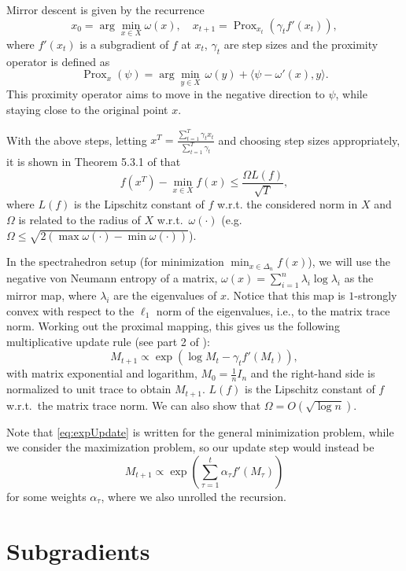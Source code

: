 \documentclass{article}
\DeclareMathOperator{\Prox}{Prox}
\begin{document}
Mirror descent is given by the recurrence
\[ x_0 = \arg\min_{x \in X} \omega(x), \quad x_{t+1} = \Prox_{x_t}(\gamma_t f'(x_t)), \]
where $f'(x_t)$ is a subgradient of $f$ at $x_t$, $\gamma_t$ are step sizes and the proximity operator is defined as
\[ \Prox_{x}(\psi ) = \arg\min_{y \in X} \, \omega(y) + \langle \psi - \omega'(x), y \rangle. \]
This proximity operator aims to move in the negative direction to $\psi$, while staying close to the original point $x$.

With the above steps, letting $x^T = \frac{\sum_{t=1}^T \gamma_t x_t}{\sum_{t=1}^T \gamma_t}$ and choosing step sizes appropriately, it is shown in Theorem 5.3.1 of \cite{lectures} that
\[ f(x^T) - \min_{x \in X} f(x) \leq \frac{\Omega L(f)}{\sqrt{T}}, \]
where $L(f)$ is the Lipschitz constant of $f$ w.r.t. the considered norm in $X$ and $\Omega$ is related to the radius of $X$ w.r.t.\ $\omega(\cdot)$ (e.g.\ $\Omega \leq \sqrt{2 (\max \omega(\cdot) - \min \omega(\cdot))}$).


In the spectrahedron setup (for minimization $\min_{x \in \Delta_n} f(x)$), we will use the negative von Neumann entropy of a matrix, $\omega(x) = \sum_{i=1}^n \lambda_i \log \lambda_i$ as the mirror map, where $\lambda_i$ are the eigenvalues of $x$. Notice that this map is $1$-strongly convex with respect to the $\ell_1$ norm of the eigenvalues, i.e., to the matrix trace norm. Working out the proximal mapping, this gives us the following multiplicative update rule (see part 2 of \cite{blog}):
\begin{equation}\label{eq:expUpdate}
  M_{t+1} \propto \exp \left( \log M_t - \gamma_t f'(M_t) \right),
\end{equation}
with matrix exponential and logarithm, $M_0 = \frac{1}{n} I_n$ and the right-hand side is normalized to unit trace to obtain $M_{t+1}$. $L(f)$ is the Lipschitz constant of $f$ w.r.t.\ the matrix trace norm. We can also show that $\Omega = O(\sqrt{\log n})$.

Note that \eqref{eq:expUpdate} is written for the general minimization problem, while we consider the maximization problem, so our update step would instead be
\[ M_{t+1} \propto \exp \left( \sum_{\tau=1}^t \alpha_\tau f'(M_\tau) \right) \]
for some weights $\alpha_\tau$, where we also unrolled the recursion.


\section{Subgradients}
\end{document}
